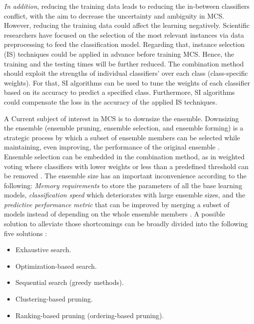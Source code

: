 \textit{In addition}, reducing the training data leads to reducing the in-between classifiers conflict, with the aim to decrease the uncertainty and ambiguity in MCS. However, reducing the training data could affect the learning negatively. Scientific researchers have focused on the selection of the most relevant instances via data preprocessing \cite{garcia2015} to feed the classification model. Regarding that, instance selection (IS) techniques could be applied in advance before training MCS. Hence, the training and the testing times will be further reduced. The combination method should exploit the strengths of individual classifiers' over each class (class-specific weights). For that, SI algorithms can be used to tune the weights of each classifier based on its accuracy to predict a specified class. Furthermore, SI algorithms could compensate the loss in the accuracy of the applied IS techniques.  

A Current subject of interest in MCS is to downsize the ensemble. Downsizing the ensemble (ensemble pruning, ensemble selection, and ensemble forming) is a strategic process by which a subset of ensemble members can be selected while maintaining, even improving, the performance of the original ensemble \cite{mousavi2015}. Ensemble selection can be embedded in the combination method, as in weighted voting where classifiers with lower weights or less than a predefined threshold can be removed \cite{krawczyk2016,li2014}. The ensemble size has an important inconvenience according to the following: \textit{Memory requirements} to store the parameters of all the base learning models, \textit{classification speed} which deteriorates with large ensemble sizes, and the \textit{predictive performance metric} that can be improved by merging a subset of models instead of depending on the whole ensemble members \cite{martinez2009,guo2013,zhou2014}. A possible solution to alleviate those shortcomings can be broadly divided into the following five solutions \cite{onan2017,mendes2012}:
\begin{itemize}[nosep]
    \item Exhaustive search.
    \item Optimization-based search.
    \item Sequential search (greedy methods).
    \item Clustering-based pruning.
    \item Ranking-based pruning (ordering-based pruning).
\end{itemize}

